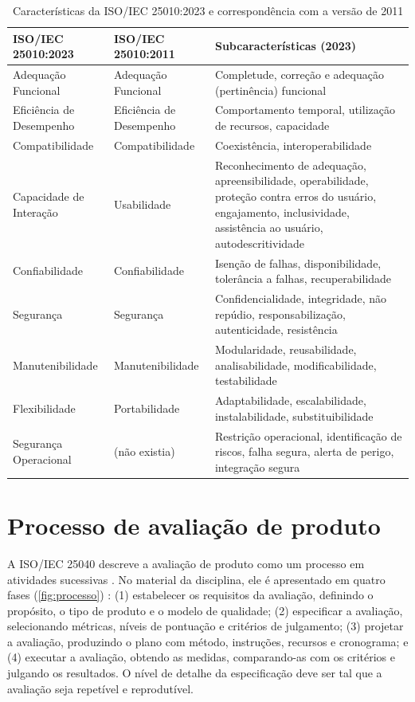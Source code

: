 \begin{table}[htb]
	\caption{Características da ISO/IEC 25010:2023 e correspondência com a versão de 2011}
	\label{tab:iso25010}
	\centering
	\footnotesize
	\begin{tabularx}{\textwidth}{L{3.6cm} L{2.7cm} Y}
		\toprule
		\textbf{ISO/IEC 25010:2023} & \textbf{ISO/IEC 25010:2011} & \textbf{Subcaracterísticas (2023)} \\
		\midrule
		Adequação Funcional & Adequação Funcional & Completude, correção e adequação (pertinência) funcional \\
		Eficiência de Desempenho & Eficiência de Desempenho & Comportamento temporal, utilização de recursos, capacidade \\
		Compatibilidade & Compatibilidade & Coexistência, interoperabilidade \\
		Capacidade de Interação & Usabilidade & Reconhecimento de adequação, apreensibilidade, operabilidade, proteção contra erros do usuário, engajamento, inclusividade, assistência ao usuário, autodescritividade \\
		Confiabilidade & Confiabilidade & Isenção de falhas, disponibilidade, tolerância a falhas, recuperabilidade \\
		Segurança & Segurança & Confidencialidade, integridade, não repúdio, responsabilização, autenticidade, resistência \\
		Manutenibilidade & Manutenibilidade & Modularidade, reusabilidade, analisabilidade, modificabilidade, testabilidade \\
		Flexibilidade & Portabilidade & Adaptabilidade, escalabilidade, instalabilidade, substituibilidade \\
		Segurança Operacional & (não existia) & Restrição operacional, identificação de riscos, falha segura, alerta de perigo, integração segura \\
		\bottomrule
	\end{tabularx}
\end{table}

\section{Processo de avaliação de produto}
\label{sec:processo}

A ISO/IEC 25040 descreve a avaliação de produto como um processo em atividades sucessivas \cite{iso25040}. No material da disciplina, ele é apresentado em quatro fases (\autoref{fig:processo}) \cite{ramos2026processo}: (1) estabelecer os requisitos da avaliação, definindo o propósito, o tipo de produto e o modelo de qualidade; (2) especificar a avaliação, selecionando métricas, níveis de pontuação e critérios de julgamento; (3) projetar a avaliação, produzindo o plano com método, instruções, recursos e cronograma; e (4) executar a avaliação, obtendo as medidas, comparando-as com os critérios e julgando os resultados. O nível de detalhe da especificação deve ser tal que a avaliação seja repetível e reprodutível.


